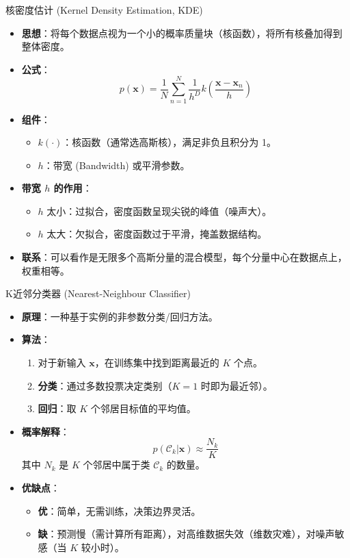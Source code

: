 \documentclass[12pt, aspectratio=169]{beamer}
\newcommand{\vect}[1]{\mathbf{#1}}
\begin{document}
\begin{frame}{核密度估计 (Kernel Density Estimation, KDE)}
    \begin{itemize}
        \item \textbf{思想}：将每个数据点视为一个小的概率质量块（核函数），将所有核叠加得到整体密度。
        \item \textbf{公式}：
        $$ p(\vect{x}) = \frac{1}{N} \sum_{n=1}^N \frac{1}{h^D} k\left( \frac{\vect{x} - \vect{x}_n}{h} \right) $$
        \item \textbf{组件}：
        \begin{itemize}
            \item $k(\cdot)$：核函数（通常选高斯核），满足非负且积分为 1。
            \item $h$：带宽 (Bandwidth) 或平滑参数。
        \end{itemize}
        \item \textbf{带宽 $h$ 的作用}：
        \begin{itemize}
            \item $h$ 太小：过拟合，密度函数呈现尖锐的峰值（噪声大）。
            \item $h$ 太大：欠拟合，密度函数过于平滑，掩盖数据结构。
        \end{itemize}
        \item \textbf{联系}：可以看作是无限多个高斯分量的混合模型，每个分量中心在数据点上，权重相等。
    \end{itemize}
\end{frame}

\begin{frame}{K近邻分类器 (Nearest-Neighbour Classifier)}
    \begin{itemize}
        \item \textbf{原理}：一种基于实例的非参数分类/回归方法。
        \item \textbf{算法}：
        \begin{enumerate}
            \item 对于新输入 $\vect{x}$，在训练集中找到距离最近的 $K$ 个点。
            \item \textbf{分类}：通过多数投票决定类别（$K=1$ 时即为最近邻）。
            \item \textbf{回归}：取 $K$ 个邻居目标值的平均值。
        \end{enumerate}
        \item \textbf{概率解释}：
        $$ p(\mathcal{C}_k|\vect{x}) \approx \frac{N_k}{K} $$
        其中 $N_k$ 是 $K$ 个邻居中属于类 $\mathcal{C}_k$ 的数量。
        \item \textbf{优缺点}：
        \begin{itemize}
            \item \textbf{优}：简单，无需训练，决策边界灵活。
            \item \textbf{缺}：预测慢（需计算所有距离），对高维数据失效（维数灾难），对噪声敏感（当 $K$ 较小时）。
        \end{itemize}
    \end{itemize}
\end{frame}
\end{document}
